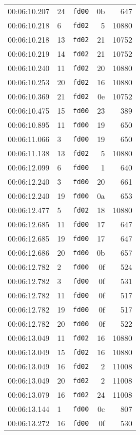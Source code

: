 \documentclass{article}
\begin{document}
\begin{longtable}{lllrr}
00:06:10.207 & 24 & \texttt{fd00} & 0b & 647 \\
00:06:10.218 & 6 & \texttt{fd02} & 5 & 10880 \\
00:06:10.218 & 13 & \texttt{fd02} & 21 & 10752 \\
00:06:10.219 & 14 & \texttt{fd02} & 21 & 10752 \\
00:06:10.240 & 11 & \texttt{fd02} & 20 & 10880 \\
00:06:10.253 & 20 & \texttt{fd02} & 16 & 10880 \\
00:06:10.369 & 21 & \texttt{fd02} & 0e & 10752 \\
00:06:10.475 & 15 & \texttt{fd00} & 23 & 389 \\
00:06:10.895 & 11 & \texttt{fd00} & 19 & 650 \\
00:06:11.066 & 3 & \texttt{fd00} & 19 & 650 \\
00:06:11.138 & 13 & \texttt{fd02} & 5 & 10880 \\
00:06:12.099 & 6 & \texttt{fd00} & 1 & 640 \\
00:06:12.240 & 3 & \texttt{fd00} & 20 & 661 \\
00:06:12.240 & 19 & \texttt{fd00} & 0a & 653 \\
00:06:12.477 & 5 & \texttt{fd02} & 18 & 10880 \\
00:06:12.685 & 11 & \texttt{fd00} & 17 & 647 \\
00:06:12.685 & 19 & \texttt{fd00} & 17 & 647 \\
00:06:12.686 & 20 & \texttt{fd00} & 0b & 657 \\
00:06:12.782 & 2 & \texttt{fd00} & 0f & 524 \\
00:06:12.782 & 3 & \texttt{fd00} & 0f & 531 \\
00:06:12.782 & 11 & \texttt{fd00} & 0f & 517 \\
00:06:12.782 & 19 & \texttt{fd00} & 0f & 517 \\
00:06:12.782 & 20 & \texttt{fd00} & 0f & 522 \\
00:06:13.049 & 11 & \texttt{fd02} & 16 & 10880 \\
00:06:13.049 & 15 & \texttt{fd02} & 16 & 10880 \\
00:06:13.049 & 16 & \texttt{fd02} & 2 & 11008 \\
00:06:13.049 & 20 & \texttt{fd02} & 2 & 11008 \\
00:06:13.079 & 16 & \texttt{fd02} & 24 & 11008 \\
00:06:13.144 & 1 & \texttt{fd00} & 0c & 807 \\
00:06:13.272 & 16 & \texttt{fd00} & 0f & 530 \\

\end{longtable}
\end{document}
